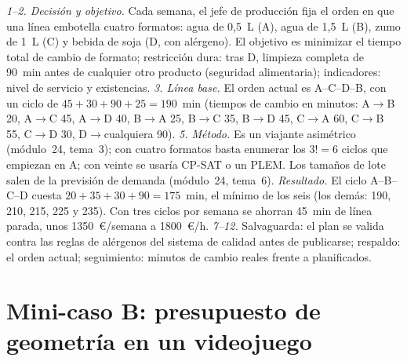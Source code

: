 \begin{ejemplo}\label{ej:mini-fabrica}
\emph{1--2. Decisión y objetivo.} Cada semana, el jefe de producción fija el orden en que una línea embotella cuatro formatos: agua de 0{,}5~L (A), agua de 1{,}5~L (B), zumo de 1~L (C) y bebida de soja (D, con alérgeno). El objetivo es minimizar el tiempo total de cambio de formato; restricción dura: tras D, limpieza completa de 90~min antes de cualquier otro producto (seguridad alimentaria); indicadores: nivel de servicio y existencias. \emph{3. Línea base.} El orden actual es A--C--D--B, con un ciclo de $45+30+90+25=190$~min (tiempos de cambio en minutos: A$\to$B 20, A$\to$C 45, A$\to$D 40, B$\to$A 25, B$\to$C 35, B$\to$D 45, C$\to$A 60, C$\to$B 55, C$\to$D 30, D$\to$cualquiera 90). \emph{5. Método.} Es un viajante asimétrico (módulo~24, tema~3); con cuatro formatos basta enumerar los $3!=6$ ciclos que empiezan en A; con veinte se usaría CP-SAT o un PLEM. Los tamaños de lote salen de la previsión de demanda (módulo~24, tema~6). \emph{Resultado.} El ciclo A--B--C--D cuesta $20+35+30+90=175$~min, el mínimo de los seis (los demás: 190, 210, 215, 225 y 235). Con tres ciclos por semana se ahorran 45~min de línea parada, unos 1350~€/semana a 1800~€/h. \emph{7--12.} Salvaguarda: el plan se valida contra las reglas de alérgenos del sistema de calidad antes de publicarse; respaldo: el orden actual; seguimiento: minutos de cambio reales frente a planificados.
\end{ejemplo}

\section{Mini-caso B: presupuesto de geometría en un videojuego}

